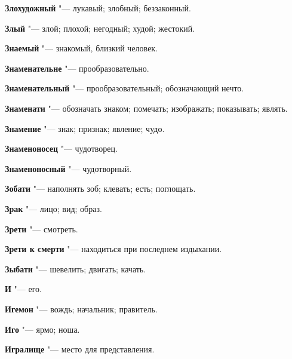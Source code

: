 \begin{mymulticols}{2}
\noindent\textbf{Злохудожный} "--- лукавый; злобный; беззаконный. 




\noindent\textbf{Злый} "--- злой; плохой; негодный; худой; жестокий. 




\noindent\textbf{Знаемый} "--- знакомый, близкий человек. 




\noindent\textbf{Знаменательне} "--- прообразовательно. 




\noindent\textbf{Знаменательный} "--- прообразовательный; обозначающий нечто. 




\noindent\textbf{Знаменати} "--- обозначать знаком; помечать; изображать; показывать; являть. 




\noindent\textbf{Знамение} "--- знак; признак; явление; чудо. 




\noindent\textbf{Знаменоносец} "--- чудотворец. 




\noindent\textbf{Знаменоносный} "--- чудотворный. 




\noindent\textbf{Зобати} "--- наполнять зоб; клевать; есть; поглощать. 




\noindent\textbf{Зрак} "--- лицо; вид; образ. 




\noindent\textbf{Зрети} "--- смотреть. 




\noindent\textbf{Зрети к смерти} "--- находиться при последнем издыхании. 




\noindent\textbf{Зыбати} "--- шевелить; двигать; качать. 









\noindent\textbf{И} "--- его. 




\noindent\textbf{Игемон} "--- вождь; начальник; правитель. 




\noindent\textbf{Иго} "--- ярмо; ноша. 




\noindent\textbf{Игралище} "--- место для представления. 





\end{mymulticols}
